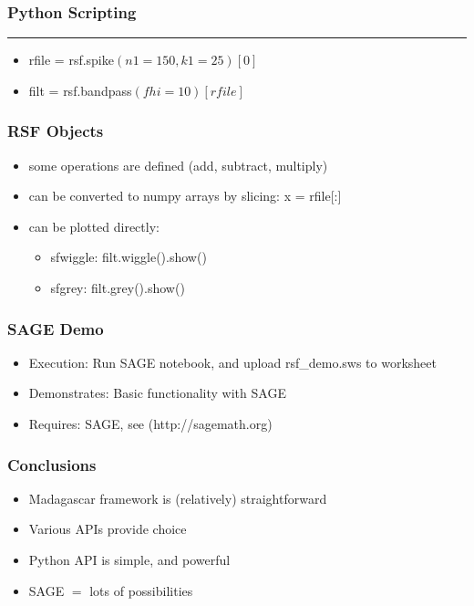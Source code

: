 \begin{frame} \frametitle{Python Scripting}
\hrule
\pause
\begin{itemize}
\item rfile = rsf.spike$(n1=150,k1=25)[0]$
\item filt = rsf.bandpass$(fhi=10)[rfile]$
\end{itemize}
\end{frame} 

\begin{frame} \frametitle{RSF Objects}
\begin{itemize}
\item some operations are defined (add, subtract, multiply)
\item can be converted to numpy arrays by slicing: x = rfile[:]
\item can be plotted directly: 
\begin{itemize}
\item sfwiggle: filt.wiggle().show()
\item sfgrey: filt.grey().show()
\end{itemize}
\end{itemize}
\end{frame}

\begin{frame}
\end{frame}

\begin{frame} \frametitle{SAGE Demo}
\begin{itemize}
\item Execution: Run SAGE notebook, and upload rsf\_demo.sws to worksheet
\item Demonstrates: Basic functionality with SAGE
\item Requires: SAGE, see (http://sagemath.org)
\end{itemize}
\end{frame}

\begin{frame} \frametitle{Conclusions}
\begin{itemize}
\item Madagascar framework is (relatively) straightforward
\item Various APIs provide choice
\item Python API is simple, and powerful
\item SAGE $=$ lots of possibilities
\end{itemize}
\end{frame}
